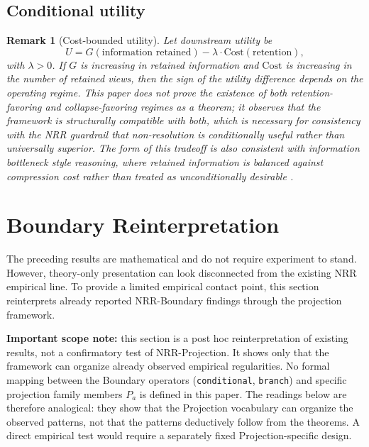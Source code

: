 \documentclass[11pt,a4paper]{article}
\newtheorem{remark}{Remark}
\begin{document}
\subsection{Conditional utility}

\begin{remark}[Cost-bounded utility]
\label{rem:utility}
Let downstream utility be
\begin{equation}
U = G(\text{information retained}) - \lambda \cdot \text{Cost}(\text{retention}),
\end{equation}
with $\lambda > 0$. If $G$ is increasing in retained information and $\text{Cost}$ is increasing in the number of retained views, then the sign of the utility difference depends on the operating regime. This paper does not prove the existence of both retention-favoring and collapse-favoring regimes as a theorem; it observes that the framework is structurally compatible with both, which is necessary for consistency with the NRR guardrail that non-resolution is conditionally useful rather than universally superior. The form of this tradeoff is also consistent with information bottleneck style reasoning, where retained information is balanced against compression cost rather than treated as unconditionally desirable \cite{tishby1999information}.
\end{remark}

\section{Boundary Reinterpretation}
\label{sec:boundary}

The preceding results are mathematical and do not require experiment to stand. However, theory-only presentation can look disconnected from the existing NRR empirical line. To provide a limited empirical contact point, this section reinterprets already reported NRR-Boundary findings \cite{saito2026boundary} through the projection framework.

\textbf{Important scope note:} this section is a post hoc reinterpretation of existing results, not a confirmatory test of NRR-Projection. It shows only that the framework can organize already observed empirical regularities. No formal mapping between the Boundary operators (\texttt{conditional}, \texttt{branch}) and specific projection family members $P_a$ is defined in this paper. The readings below are therefore analogical: they show that the Projection vocabulary can organize the observed patterns, not that the patterns deductively follow from the theorems. A direct empirical test would require a separately fixed Projection-specific design.
\end{document}
